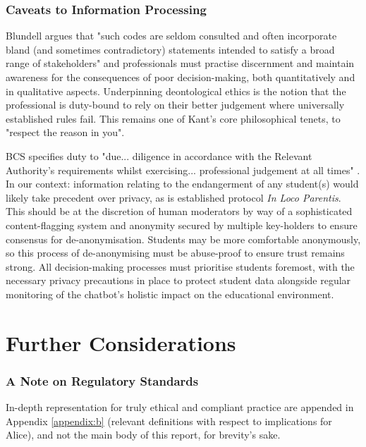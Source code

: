 \documentclass[14pt,a4paper]{article}
\begin{document}
\begin{multicols}{2}
\subsubsection*{Caveats to Information Processing}

Blundell argues that "such codes are seldom consulted and often incorporate bland (and sometimes contradictory) statements intended to satisfy a broad range of stakeholders" \textit{\parencite[p. 40]{Blundell2020}} and professionals must practise discernment and maintain awareness for the consequences of poor decision-making, both quantitatively and in qualitative aspects.
Underpinning deontological ethics is the notion that the professional is duty-bound to rely on their better judgement where universally established rules fail.
This remains one of Kant's core philosophical tenets, to "respect the reason in you".

BCS specifies duty to "due... diligence in accordance with the Relevant Authority's requirements whilst exercising... professional judgement at all times" \textit{\parencite[p. 2]{BCS2024}}. In our context: information relating to the endangerment of any student(s) would likely take precedent over privacy, as is established protocol \textit{In Loco Parentis}.
This should be at the discretion of human moderators by way of a sophisticated content-flagging system and anonymity secured by multiple key-holders to ensure consensus for de-anonymisation.
Students may be more comfortable anonymously, so this process of de-anonymising must be abuse-proof to ensure trust remains strong.
All decision-making processes must prioritise students foremost, with the necessary privacy precautions in place to protect student data alongside regular monitoring of the chatbot's holistic impact on the educational environment.



\section{Further Considerations}

\subsubsection*{A Note on Regulatory Standards}
In-depth representation for truly ethical and compliant practice are appended in Appendix \ref{appendix:b} (relevant definitions with respect to implications for Alice), and not the main body of this report, for brevity's sake.


\end{multicols}
\end{document}
